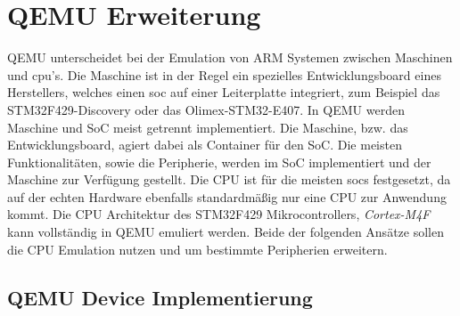 \section{QEMU Erweiterung}

QEMU unterscheidet bei der Emulation von ARM Systemen zwischen Maschinen und
\ac{cpu}'s.
Die Maschine ist in der Regel ein spezielles Entwicklungsboard eines
Herstellers, welches einen \ac{soc} auf einer Leiterplatte integriert, zum
Beispiel das STM32F429-Discovery\cite{Stm32F429DiscoveryBoard} oder das
Olimex-STM32-E407\cite{OlimexStm32E407Board}.
\newline
In QEMU werden Maschine und SoC meist getrennt implementiert.
Die Maschine, bzw. das Entwicklungsboard, agiert dabei als Container für den
SoC.
Die meisten Funktionalitäten, sowie die Peripherie, werden im SoC
implementiert und der Maschine zur Verfügung gestellt.
Die CPU ist für die meisten \acp{soc} festgesetzt, da auf der echten Hardware
ebenfalls standardmäßig nur eine CPU zur Anwendung kommt.
Die CPU Architektur des STM32F429 Mikrocontrollers, \textit{Cortex-M4F} kann
vollständig in QEMU emuliert werden.
Beide der folgenden Ansätze sollen die CPU Emulation nutzen und um bestimmte
Peripherien erweitern.

\subsection{QEMU Device Implementierung} \label{konzept-qemu-dev}

